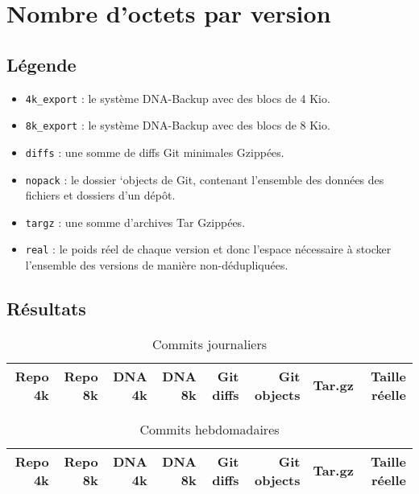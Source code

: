 \documentclass[a4paper]{report}
\begin{document}
\section{Nombre d'octets par version}

\subsection{Légende}

\begin{itemize}
\item
  \verb|4k_export| : le système DNA-Backup avec des blocs de 4 Kio.
\item
  \verb|8k_export| : le système DNA-Backup avec des blocs de 8 Kio.
\item
  \verb|diffs| : une somme de diffs Git minimales Gzippées.
\item
  \verb|nopack| : le dossier `objects de Git, contenant l'ensemble des
  données des fichiers et dossiers d'un dépôt.
\item
  \verb|targz| : une somme d'archives Tar Gzippées.
\item
  \verb|real| : le poids réel de chaque version et donc l'espace
  nécessaire à stocker l'ensemble des versions de manière
  non-dédupliquées.
\end{itemize}

\subsection{Résultats}


\begin{table*}[ht]
\centering
\begin{tabularx}{\textwidth}{RRRRRRRR}
\textbf{Repo 4k} &
\textbf{Repo 8k} &
\textbf{DNA 4k} &
\textbf{DNA 8k} &
\textbf{Git diffs} &
\textbf{Git objects} &
\textbf{Tar.gz} &
\textbf{Taille réelle} \\
\hline

\end{tabularx}
\caption{Commits journaliers}
\label{tab:commits-daily}
\end{table*}


\begin{table*}[ht]
\begin{tabularx}{\textwidth}{RRRRRRRR}
\textbf{Repo 4k} &
\textbf{Repo 8k} &
\textbf{DNA 4k} &
\textbf{DNA 8k} &
\textbf{Git diffs} &
\textbf{Git objects} &
\textbf{Tar.gz} &
\textbf{Taille réelle} \\
\hline

\end{tabularx}
\caption{Commits hebdomadaires}
\label{tab:commits-weekly}
\end{table*}
\end{document}
